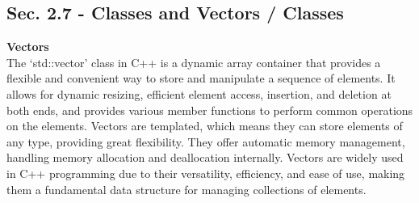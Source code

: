 \subsection{Sec. 2.7 - Classes and Vectors / Classes}
\noindent \textbf{Vectors} \\

The `std::vector' class in C++ is a dynamic array container that provides a flexible and convenient way to store and manipulate a sequence of elements. It allows for dynamic resizing, efficient element access, insertion, and deletion 
at both ends, and provides various member functions to perform common operations on the elements. Vectors are templated, which means they can store elements of any type, providing great flexibility. They offer automatic memory management, 
handling memory allocation and deallocation internally. Vectors are widely used in C++ programming due to their versatility, efficiency, and ease of use, making them a fundamental data structure for managing collections of elements. \\

